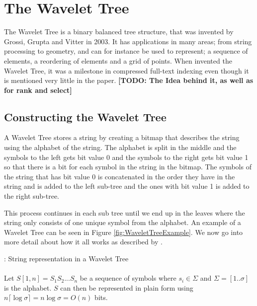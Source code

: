 \section{The Wavelet Tree}
The Wavelet Tree is a binary balanced tree structure, that was invented by Grossi, Grupta and Vitter \citep{Grossi:2003:HET:644108.644250} in 2003. 
It has applications in many areas; from string processing to geometry, and can for instance be used to represent; a sequence of elements, a reordering of elements and a grid of points. 
When \citep{Grossi:2003:HET:644108.644250} invented the Wavelet Tree, it was a milestone in compressed full-text indexing even though it is mentioned very little in the paper.
\textbf{[TODO: The Idea behind it, as well as for rank and select]}

\subsection{Constructing the Wavelet Tree}
A Wavelet Tree stores a string by creating a bitmap that describes the string using the alphabet of the string. The alphabet is split in the middle and the symbols to the left gets bit value 0 and the symbols to the right gets bit value 1 so that there is a bit for each symbol in the string in the bitmap. 
The symbols of the string that has bit value 0 is concatenated in the order they have in the string and is added to the left sub-tree and the ones with bit value 1 is added to the right sub-tree. 

This process continues in each sub tree until we end up in the leaves where the string only consists of one unique symbol from the alphabet. 
An example of a Wavelet Tree can be seen in Figure \ref{fig:WaveletTreeExample}. 
We now go into more detail about how it all works as described by \citep{Navjda13}.

\vspace{0.5 cm}
\begin{mdframed}[nobreak, linecolor=lightgray]
\begin{definition}: String representation in a Wavelet Tree\\\\
Let $S[1,n] = S_1 S_2 ... S_n$ be a sequence of symbols where $s_i \in \Sigma$ and $\Sigma = [1 .. \sigma]$ is the alphabet. $S$ can then be represented in plain form using $n \lceil \log \sigma \rceil = n \log \sigma = O(n)$ bits.
\end{definition}
\end{mdframed}
\vspace{0.5 cm}


